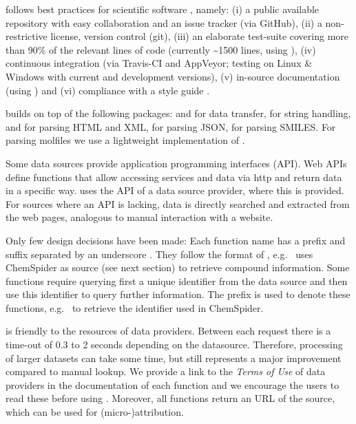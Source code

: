\documentclass[article, shortnames]{jss}\usepackage[]{graphicx}\usepackage[]{color}
\begin{document}
 follows best practices for scientific software \citep{wilson_best_2014, poisot_best_2015}, namely: (i) a public available repository with easy collaboration and an issue tracker (via GitHub), (ii) a non-restrictive license, version control (git), (iii) an elaborate test-suite covering more than 90\% of the relevant lines of code (currently \textasciitilde 1500 lines, using  \citep{wickham_testthat:_2011}), (iv) continuous integration (via Travis-CI and AppVeyor; testing on Linux \& Windows with current and development  versions), (v) in-source documentation (using  \citep{wickham_roxygen2:_2015}) and (vi) compliance with a style guide \citep{wickham_advanced_2015}.

 builds on top of the following  packages:
 \citep{lang_rcurl:_2015} and  \citep{wickham_httr} for data transfer,
 \citep{wickham_stringr:_2015} for string handling,
 \citep{wickham_xml2} and  \citep{wickham_rvest} for parsing HTML and XML,
 \citep{ooms_jsonlite_2014} for parsing JSON,
 \citep{guha_rcdk} for parsing SMILES.
For parsing molfiles we use a lightweight implementation of \citep{Grabner_Varmuza_Dehmer_2012}.

Some data sources provide application programming interfaces (API).
Web APIs define functions that allow accessing services and data via http and return data in a specific way.
 uses the API of a data source provider, where this is provided.
For sources where an API is lacking, data is directly searched and extracted from the web pages, analogous to manual interaction with a website.

Only few design decisions have been made:
Each function name has a prefix and suffix separated by an underscore \citep{Chamberlain_Szocs_2013}.
They follow the format of , e.g.\  uses ChemSpider as source (see next section) to retrieve compound information.
Some functions require querying first a unique identifier from the data source and then use this identifier to query further information.
The prefix  is used to denote these functions, e.g.\  to retrieve the identifier used in ChemSpider.

 is friendly to the resources of data providers. 
Between each request there is a time-out of 0.3 to 2 seconds depending on the datasource. 
Therefore, processing of larger datasets can take some time, but still represents a major improvement compared to manual lookup.
We provide a link to the \emph{Terms of Use} of data providers in the documentation of each function and we encourage the users to read these before using .
Moreover, all functions return an URL of the source, which can be used for \mbox{(micro-)attribution}.
\end{document}
